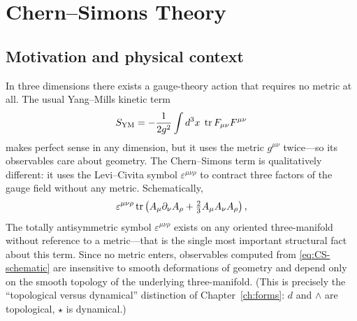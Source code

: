 ﻿%
%
%

\chapter{Chern--Simons Theory}\label{ch:chern-simons}

\section{Motivation and physical context}\label{sec:motivation}

In three dimensions there exists a gauge-theory action that requires no metric at all.  The usual Yang--Mills kinetic term
\begin{equation}\label{eq:YM-action}
S_{\text{YM}} = -\frac{1}{2g^2}\int d^3x\; \operatorname{tr} F_{\mu\nu}F^{\mu\nu}
\end{equation}
makes perfect sense in any dimension, but it uses the metric $g^{\mu\nu}$ twice---so its observables care about geometry.  The Chern--Simons term is qualitatively different: it uses the Levi--Civita symbol $\varepsilon^{\mu\nu\rho}$ to contract three factors of the gauge field without any metric.  Schematically,
\begin{equation}\label{eq:CS-schematic}
\varepsilon^{\mu\nu\rho}\operatorname{tr}\left(A_\mu \partial_\nu A_\rho + \tfrac{2}{3}A_\mu A_\nu A_\rho\right),
\end{equation}
The totally antisymmetric symbol $\varepsilon^{\mu\nu\rho}$ exists on any oriented three-manifold without reference to a metric---that is the single most important structural fact about this term.  Since no metric enters, observables computed from \eqref{eq:CS-schematic} are insensitive to smooth deformations of geometry and depend only on the smooth topology of the underlying three-manifold.  (This is precisely the ``topological versus dynamical'' distinction of Chapter~\ref{ch:forms}: $d$ and $\wedge$ are topological, $\star$ is dynamical.)

\medskip

